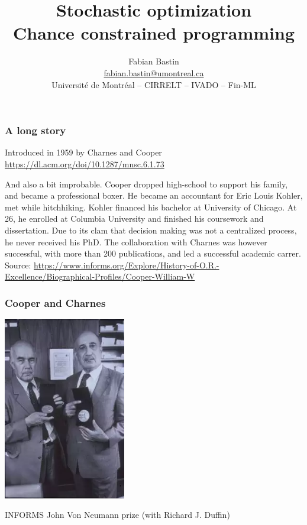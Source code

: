 \documentclass{beamer}
\title[CP]{Stochastic optimization\\Chance constrained programming}
\author[Fabian Bastin]{Fabian Bastin \\ \url{fabian.bastin@umontreal.ca} \\ Université de Montréal -- CIRRELT -- IVADO -- Fin-ML}
\date{}
\begin{document}

\frame{\titlepage}

\begin{frame}
\frametitle{A long story}

Introduced in 1959 by Charnes and Cooper \url{https://dl.acm.org/doi/10.1287/mnsc.6.1.73}

\mbox{}

And also a bit improbable. Cooper dropped high-school to support his family, and became a professional boxer. He became an accountant for Eric Louis Kohler, met while hitchhiking. Kohler financed his bachelor at University of Chicago. At 26, he enrolled at Columbia University and finished his coursework and dissertation. Due to its clam that decision making was not a centralized process, he never received his PhD. The collaboration with Charnes was however successful, with more than 200 publications, and led a successful academic carrer. Source: \url{https://www.informs.org/Explore/History-of-O.R.-Excellence/Biographical-Profiles/Cooper-William-W}

\end{frame}

\begin{frame}[fragile]
\frametitle{Cooper and Charnes}

\begin{center}
\includegraphics[width=0.4\textwidth]{imgs/coopercharnes.png}

INFORMS John Von Neumann prize (with Richard J. Duffin)
\end{center}

\end{frame}
\end{document}

